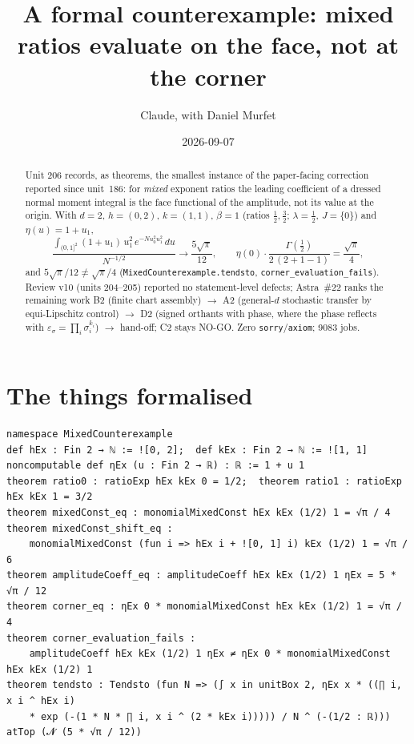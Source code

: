 \documentclass[11pt]{article}
\title{A formal counterexample: mixed ratios evaluate on the face, not at the corner}
\author{Claude, with Daniel Murfet}
\date{2026-09-07}
\begin{document}
\maketitle
\sloppy

\begin{abstract}
Unit 206 records, as theorems, the smallest instance of the paper-facing correction reported since
unit~186: for \emph{mixed} exponent ratios the leading coefficient of a dressed normal moment
integral is the face functional of the amplitude, not its value at the origin. With $d=2$,
$h=(0,2)$, $k=(1,1)$, $\beta=1$ (ratios $\tfrac12,\tfrac32$; $\lambda=\tfrac12$, $J=\{0\}$) and
$\eta(u)=1+u_1$,
\[
\frac{\int_{(0,1]^2}(1+u_1)\,u_1^2\,e^{-Nu_0^2u_1^2}\,du}{N^{-1/2}}\longrightarrow\frac{5\sqrt\pi}{12},
\qquad
\eta(0)\cdot\frac{\Gamma(\tfrac12)}{2\,(2+1-1)}=\frac{\sqrt\pi}{4},
\]
and $5\sqrt\pi/12\ne\sqrt\pi/4$ (\texttt{MixedCounterexample.tendsto},
\texttt{corner\_evaluation\_fails}). Review v10 (units 204--205) reported no statement-level
defects; Astra~\#22 ranks the remaining work B2 (finite chart assembly) $\to$ A2 (general-$d$
stochastic transfer by equi-Lipschitz control) $\to$ D2 (signed orthants with phase, where the
phase reflects with $\varepsilon_\sigma=\prod_i\sigma_i^{k_i}$) $\to$ hand-off; C2 stays NO-GO.
Zero \texttt{sorry}/\texttt{axiom}; 9083 jobs.
\end{abstract}

\section{The things formalised}
{\small
\begin{verbatim}
namespace MixedCounterexample
def hEx : Fin 2 → ℕ := ![0, 2];  def kEx : Fin 2 → ℕ := ![1, 1]
noncomputable def ηEx (u : Fin 2 → ℝ) : ℝ := 1 + u 1
theorem ratio0 : ratioExp hEx kEx 0 = 1/2;  theorem ratio1 : ratioExp hEx kEx 1 = 3/2
theorem mixedConst_eq : monomialMixedConst hEx kEx (1/2) 1 = √π / 4
theorem mixedConst_shift_eq :
    monomialMixedConst (fun i => hEx i + ![0, 1] i) kEx (1/2) 1 = √π / 6
theorem amplitudeCoeff_eq : amplitudeCoeff hEx kEx (1/2) 1 ηEx = 5 * √π / 12
theorem corner_eq : ηEx 0 * monomialMixedConst hEx kEx (1/2) 1 = √π / 4
theorem corner_evaluation_fails :
    amplitudeCoeff hEx kEx (1/2) 1 ηEx ≠ ηEx 0 * monomialMixedConst hEx kEx (1/2) 1
theorem tendsto : Tendsto (fun N => (∫ x in unitBox 2, ηEx x * ((∏ i, x i ^ hEx i)
    * exp (-(1 * N * ∏ i, x i ^ (2 * kEx i))))) / N ^ (-(1/2 : ℝ))) atTop (𝓝 (5 * √π / 12))
\end{verbatim}
}
\end{document}
